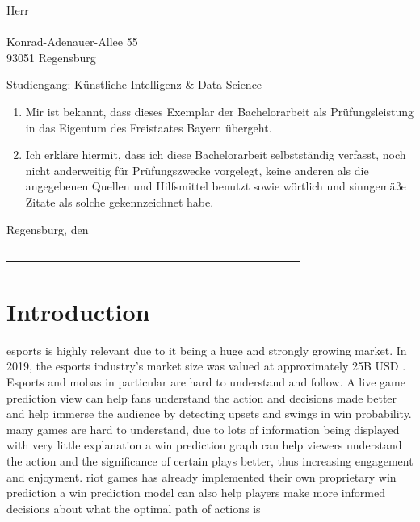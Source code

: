 \documentclass[12pt, a4paper, headinclude, twoside, plainheadsepline, open=right, numbers=noenddot, hidelinks, toc=listof, toc=bibliography]{scrreprt}
\begin{document}
\noindent
Herr\\
\@author\\
Konrad-Adenauer-Allee 55\\
93051 Regensburg\\
\smallskip

\noindent
Studiengang: Künstliche Intelligenz \& Data Science
\bigskip

\begin{enumerate}
\item Mir ist bekannt, dass dieses Exemplar der Bachelorarbeit als Prüfungsleistung in das Eigentum des Freistaates Bayern übergeht.
\item Ich erkläre hiermit, dass ich diese Bachelorarbeit selbstständig verfasst, noch nicht anderweitig für Prüfungszwecke vorgelegt, keine anderen als die angegebenen Quellen und Hilfsmittel benutzt sowie wörtlich und sinngemäße Zitate als solche gekennzeichnet habe.
\end{enumerate}
\vspace{1cm}
Regensburg, den \@date\\
\medskip
\medskip

\noindent
\underline{~~~~~~~~~~~~~~~~~~~~~~~~~~~~~~~~~~~~~~~~~~~~~~~~~~~~}\\
\@author

\makeatother



\cleardoublepage
{}\tableofcontents 										%




\pagestyle{scrheadings} 																%
\cleardoublepage
{} 																	%

\chapter{Introduction}
\label{chap:intro}


esports is highly relevant due to it being a huge and strongly growing market.
In 2019, the esports industry's market size was valued at approximately 25B USD \cite{ahnOneBillionDollar2020}.
Esports and mobas in particular are hard to understand and follow. A live game prediction view can help fans understand the action and decisions made better and help immerse the audience by detecting upsets and swings in win probability.
many games are hard to understand, due to lots of information being displayed with very little explanation
a win prediction graph can help viewers understand the action and the significance of certain plays better, thus increasing engagement and enjoyment.
riot games has already implemented their own proprietary win prediction
a win prediction model can also help players make more informed decisions about what the optimal path of actions is
\end{document}
